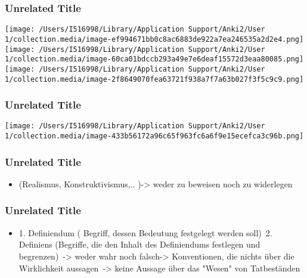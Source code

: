 \documentclass[aspectratio=169]{beamer}
\begin{document}
\begin{frame}
\frametitle{Unrelated Title}

\begin{center}
\texttt{[image: /Users/I516998/Library/Application Support/Anki2/User 1/collection.media/image-ef994671bb0c8ac6883de922a7ea246535a2d2e4.png]}
\texttt{[image: /Users/I516998/Library/Application Support/Anki2/User 1/collection.media/image-60ca01bdccb293a49e7e6deaf15572d3eaa80085.png]}
\texttt{[image: /Users/I516998/Library/Application Support/Anki2/User 1/collection.media/image-2f8649070fea63721f938a7f7a63b027f3f5c9c9.png]}
\end{center}


\note[item]{}
\end{frame}
\begin{frame}
\frametitle{Unrelated Title}

\begin{center}
\texttt{[image: /Users/I516998/Library/Application Support/Anki2/User 1/collection.media/image-433b56172a96c65f963fc6a6f9e15ecefca3c96b.png]}
\end{center}


\note[item]{}
\end{frame}
\begin{frame}
\frametitle{Unrelated Title}


\begin{itemize}
\item (Realismus, Konstruktivismus,.. )-> weder zu beweisen noch zu widerlegen 
\end{itemize}

\note[item]{}
\end{frame}
\begin{frame}
\frametitle{Unrelated Title}


\begin{itemize}
\item 1. Definiendum ( Begriff, dessen Bedeutung festgelegt werden soll) 2. Definiens (Begriffe, die den Inhalt des Definiendums festlegen und begrenzen) -> weder wahr noch falsch-> Konventionen, die nichts über die Wirklichkeit aussagen -> keine Aussage über das "Wesen" von Tatbeständen 
\end{itemize}

\note[item]{}
\end{frame}
\end{document}
